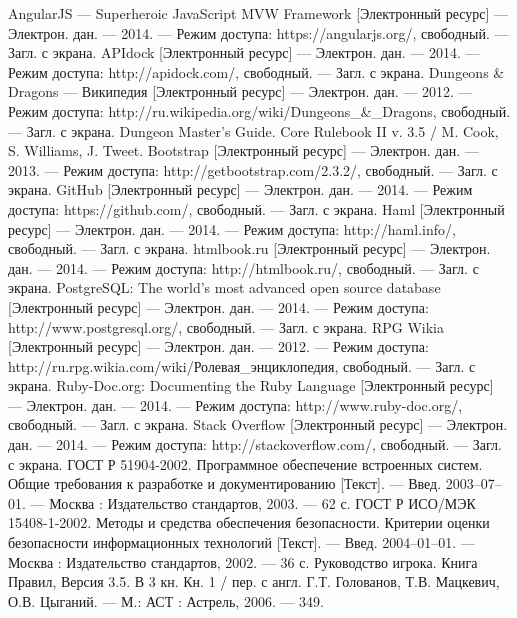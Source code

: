 \begin{thebibliography}{@@@@}
   AngularJS --- Superheroic JavaScript MVW Framework [Электронный ресурс] --- Электрон. дан. --- 2014. --- Режим доступа: https://angularjs.org/, свободный. --- Загл. с экрана.
   APIdock [Электронный ресурс] --- Электрон. дан. --- 2014. --- Режим доступа: http://apidock.com/, свободный. --- Загл. с экрана.
   Dungeons \& Dragons — Википедия [Электронный ресурс] --- Электрон. дан. --- 2012. --- Режим доступа: http://ru.wikipedia.org/wiki/Dungeons\_\&\_Dragons, свободный. --- Загл. с экрана.
   Dungeon Master's Guide. Core Rulebook II v. 3.5 / M. Cook, S. Williams, J. Tweet.
   Bootstrap [Электронный ресурс] --- Электрон. дан. --- 2013. --- Режим доступа: http://getbootstrap.com/2.3.2/, свободный. --- Загл. с экрана.
   GitHub [Электронный ресурс] --- Электрон. дан. --- 2014. --- Режим доступа: https://github.com/, свободный. --- Загл. с экрана.
   Haml [Электронный ресурс] --- Электрон. дан. --- 2014. --- Режим доступа: http://haml.info/, свободный. --- Загл. с экрана.
   htmlbook.ru [Электронный ресурс] --- Электрон. дан. --- 2014. --- Режим доступа: http://htmlbook.ru/, свободный. --- Загл. с экрана.
   PostgreSQL: The world's most advanced open source database [Электронный ресурс] --- Электрон. дан. --- 2014. --- Режим доступа: http://www.postgresql.org/, свободный. --- Загл. с экрана.
   RPG Wikia [Электронный ресурс] --- Электрон. дан. --- 2012. --- Режим доступа: http://ru.rpg.wikia.com/wiki/Ролевая\_энциклопедия, свободный. --- Загл. с экрана.
   Ruby-Doc.org: Documenting the Ruby Language [Электронный ресурс] --- Электрон. дан. --- 2014. --- Режим доступа: http://www.ruby-doc.org/, свободный. --- Загл. с экрана.
   Stack Overflow [Электронный ресурс] --- Электрон. дан. --- 2014. --- Режим доступа: http://stackoverflow.com/, свободный. --- Загл. с экрана.
   ГОСТ Р 51904-2002. Программное обеспечение встроенных систем. Общие требования к разработке и документированию [Текст]. --- Введ. 2003–07–01. --- Москва : Издательство стандартов, 2003. --- 62 с. 
   ГОСТ Р ИСО/МЭК 15408-1-2002. Методы и средства обеспечения безопасности. Критерии оценки безопасности информационных технологий [Текст]. --- Введ. 2004–01–01. --- Москва : Издательство стандартов, 2002. --- 36 с.
   Руководство игрока. Книга Правил, Версия 3.5. В 3 кн. Кн. 1 / пер. с англ. Г.Т. Голованов, Т.В. Мацкевич, О.В. Цыганий. — М.: АСТ : Астрель, 2006. — 349.
\end{thebibliography}
